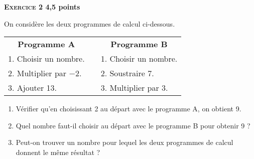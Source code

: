 \textbf{\textsc{Exercice 2} \hfill 4,5 points}

\medskip

On considère les deux programmes de calcul ci-dessous. 

\begin{center}
\begin{tabularx}{0.75\linewidth}{|X|m{0.4cm}|X|}\cline{1-1}\cline{3-3}
\multicolumn{1}{|c|}{\textbf{Programme A}}&&\multicolumn{1}{|c|}{\textbf{Programme B}}\\\cline{1-1}\cline{3-3}  
1. Choisir un nombre.&&1. Choisir un nombre. \\ 
2. Multiplier par $-2$.&&2. Soustraire 7.  \\
3. Ajouter 13.&&3.  Multiplier par 3. \\\cline{1-1}\cline{3-3}
\end{tabularx}
\end{center} 

\begin{enumerate}
\item Vérifier qu'en choisissant 2 au départ avec le programme A, on obtient 9. 
\item Quel nombre faut-il choisir au départ avec le programme B pour obtenir 9 ? 
\item Peut-on trouver un nombre pour lequel les deux programmes de calcul donnent le même résultat ? 
\end{enumerate} 

\bigskip

